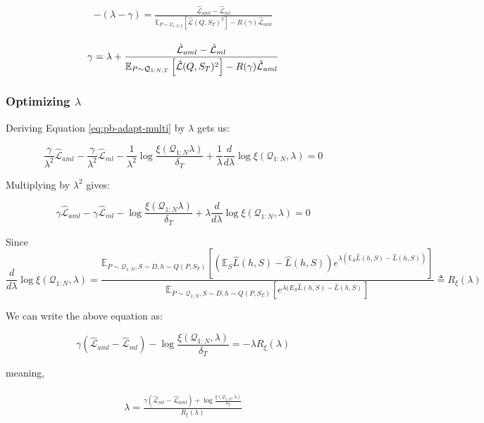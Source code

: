 \documentclass{article}
\theoremstyle{definition}
\newcommand{\Expect}[2]{\mathbb{E}_{#1}\left [#2 \right ]}
\begin{document}
\begin{align*} 
\begin{split}
-(\lambda-\gamma) = \frac{\hat{\mathcal{L}}_{aml}-\hat{\mathcal{L}}_{ml}}{\Expect{P\sim \mathcal{Q}_{1:N,T}}{\hat{\mathcal{L}}(Q,S_T)^2}-R(\gamma)\hat{\mathcal{L}}_{aml}}
\end{split}
\end{align*}

\begin{align} \label{eq:meta-pb-gamma}
\begin{split}
\gamma = \lambda+\frac{\hat{\mathcal{L}}_{aml}-\hat{\mathcal{L}}_{ml}}{\Expect{P\sim \mathcal{Q}_{1:N,T}}{\hat{\mathcal{L}}(Q,S_T)^2}-R(\gamma)\hat{\mathcal{L}}_{aml}}
\end{split}\hfill
\end{align}

\subsubsection{Optimizing $\lambda$}

Deriving Equation \ref{eq:pb-adapt-multi} by $\lambda$ gets us:

$$\frac{\gamma}{\lambda^2} \hat{\mathcal{L}}_{aml}-\frac{\gamma}{\lambda^2}\hat{\mathcal{L}}_{ml}-\frac{1}{\lambda^2}\log\frac{\xi(\mathcal{Q}_{1:N}\lambda)}{\delta_T}+\frac{1}{\lambda}\frac{d}{d\lambda}\log\xi(\mathcal{Q}_{1:N},\lambda)=0$$

Multiplying by $\lambda^2$ gives:

$$\gamma \hat{\mathcal{L}}_{aml}-\gamma\hat{\mathcal{L}}_{ml}-\log\frac{\xi(\mathcal{Q}_{1:N}\lambda)}{\delta_T}+\lambda\frac{d}{d\lambda}\log\xi(\mathcal{Q}_{1:N},\lambda)=0$$

Since 
$$\frac{d}{d\lambda}\log\xi(\mathcal{Q}_{1:N},\lambda)=\frac{\Expect{P\sim \mathcal{Q}_{1:N},S\sim D,h\sim Q(P,S_T)}{(\mathbb{E}_S\hat{L}(h, S)-\hat{L}(h, S))e^{\lambda(\mathbb{E}_S\hat{L}(h, S)-\hat{L}(h, S))} }}{\Expect{P\sim \mathcal{Q}_{1:N},S\sim D,h\sim Q(P,S_T)}{e^{\lambda(E_S\hat{L}(h, S)-\hat{L}(h, S)} }}\triangleq R_\xi(\lambda)$$

We can write the above equation as:

$$\gamma(\hat{\mathcal{L}}_{aml}-\hat{\mathcal{L}}_{ml})-\log\frac{\xi(\mathcal{Q}_{1:N},\lambda)}{\delta_T}=-\lambda R_\xi(\lambda)$$

meaning,

\begin{align} \label{eq:meta-pb-lambda}
\begin{split}
\lambda = \frac{\gamma(\hat{\mathcal{L}}_{ml}-\hat{\mathcal{L}}_{aml})+\log\frac{\xi(\mathcal{Q}_{1:N},\lambda)}{\delta_T}}{R_\xi(\lambda)}
\end{split}
\end{align}
\end{document}
